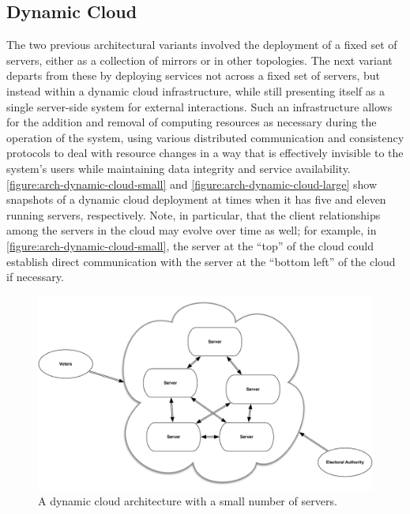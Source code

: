 \subsection{Dynamic Cloud}

The two previous architectural variants involved the deployment of a
fixed set of servers, either as a collection of mirrors or in other
topologies. The next variant departs from these by deploying services
not across a fixed set of servers, but instead within a dynamic cloud
infrastructure, while still presenting itself as a single server-side
system for external interactions. Such an infrastructure allows for
the addition and removal of computing resources as necessary during
the operation of the system, using various distributed communication
and consistency protocols to deal with resource changes in a way that
is effectively invisible to the system's users while maintaining data
integrity and service
availability. \autoref{figure:arch-dynamic-cloud-small} and
\autoref{figure:arch-dynamic-cloud-large} show snapshots of a dynamic
cloud deployment at times when it has five and eleven running servers,
respectively. Note, in particular, that the client relationships among
the servers in the cloud may evolve over time as well; for example, in
\autoref{figure:arch-dynamic-cloud-small}, the server at the ``top''
of the cloud could establish direct communication with the server at
the ``bottom left'' of the cloud if necessary.

\begin{figure}[p]
\begin{center}
\includegraphics[width=5.5in]{architecture_resources/dynamic-cloud-small.pdf}
\end{center}
\caption{A dynamic cloud architecture with a small number of servers.}
\label{figure:arch-dynamic-cloud-small}
\end{figure}

